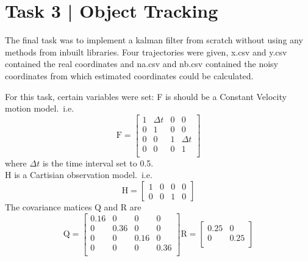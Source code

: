 \documentclass[conference]{IEEEtran}
\begin{document}
\section*{Task 3 | Object Tracking}

    The final task was to implement a kalman filter from scratch without using any methods from inbuilt libraries. Four trajectories were given,
    x.csv and y.csv contained the real coordinates and na.csv and nb.csv contained the noisy coordinates from which estimated coordinates could 
    be calculated.
    
    For this task, certain variables were set:
    F is should be a Constant Velocity motion model.\ i.e.
    \begin{equation}
        \text{F} = \begin{bmatrix}
            1 & \Delta t & 0 & 0        \\
            0 & 1        & 0 & 0        \\
            0 & 0        & 1 & \Delta t \\
            0 & 0        & 0 & 1        \\
        \end{bmatrix}
    \end{equation}
    where $\Delta t$ is the time interval set to 0.5.\\
    H is a Cartisian observation model.\ i.e.
    \begin{equation}
        \text{H} = \begin{bmatrix}
            1&0&0&0\\
            0&0&1&0
        \end{bmatrix}
    \end{equation}
    The covariance matices Q and R are
    \begin{equation}
        \text{Q} = \begin{bmatrix}
            0.16 & 0 & 0 & 0 \\
            0 & 0.36 & 0 & 0 \\
            0 & 0 & 0.16 & 0 \\ 
            0 & 0 & 0 & 0.36 \\ 
        \end{bmatrix}
        \text{R} = \begin{bmatrix}
            0.25 & 0 \\ 
            0 & 0.25 \\ 
        \end{bmatrix}
    \end{equation}
\end{document}
